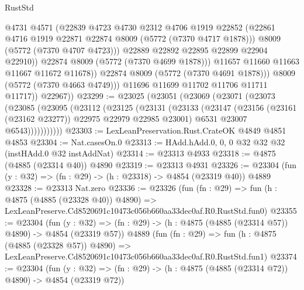 \begin{lexlean}{RustStd}
\begin{coremodule}
                          @4731
                          @4571
                          (@22839
                            @4723
                            @4730
                            @2312
                            @4706
                            @1919
                            @22852
                            (@22861 @4716 @1919 @22871 @22874 @8009 (@5772 (@7370 @4717 @1878)))
                            @8009
                            (@5772 (@7370 @4707 @4723)))
                          @22889
                          @22892
                          @22895
                          @22899
                          @22904
                          @22910))
                      @22874
                      @8009
                      (@5772 (@7370 @4699 @1878)))
                    @11657
                    @11660
                    @11663
                    @11667
                    @11672
                    @11678))
                @22874
                @8009
                (@5772 (@7370 @4691 @1878)))
              @8009
              (@5772 (@7370 @4663 @4749)))
            @11696
            @11699
            @11702
            @11706
            @11711
            @11717))
        @22967))
@23299 := @23025
    (@23051
      (@23069
        (@23071
          (@23073
            (@23085
              (@23095
                (@23112
                  (@23125
                    (@23131
                      (@23133
                        (@23147
                          (@23156 (@23161 (@23162 @23277)) @22975 @22979 @22985 @23001)
                          @6531
                          @23007
                          @6543)))))))))))
@23303 := LexLeanPreservation.Rust.CrateOK @4849 @4851 @4853
@23304 := Nat.casesOn.{0}
@23313 := HAdd.hAdd.{0, 0, 0} @32 @32 @32 (instHAdd.{0} @32 instAddNat)
@23314 := @23313 @4933
@23318 := @4875 (@4885 (@23314 @40)) @4890
@23319 := @23313 @4931
@23326 := @23304 (fun (y : @32) => (fn : @29) -> (h : @23318) -> @4854 (@23319 @40)) @4889
@23328 := @23313 Nat.zero
@23336 := @23326
    (fun (fn : @29) =>
    fun (h : @4875 (@4885 (@23328 @40)) @4890) =>
    LexLeanPreserve.Cd8520691c10473c056b660aa33dec0af.R0.RustStd.fun0)
@23355 := @23304
    (fun (y : @32) => (fn : @29) -> (h : @4875 (@4885 (@23314 @57)) @4890) -> @4854 (@23319 @57))
    @4889
    (fun (fn : @29) =>
    fun (h : @4875 (@4885 (@23328 @57)) @4890) =>
    LexLeanPreserve.Cd8520691c10473c056b660aa33dec0af.R0.RustStd.fun1)
@23374 := @23304
    (fun (y : @32) => (fn : @29) -> (h : @4875 (@4885 (@23314 @72)) @4890) -> @4854 (@23319 @72))

\end{coremodule}
\end{lexlean}
